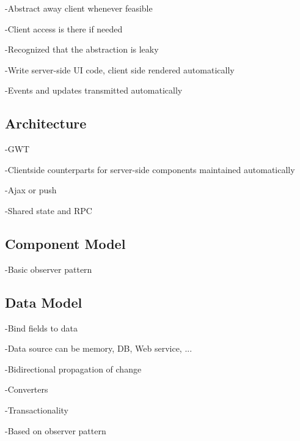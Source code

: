 -Abstract away client whenever feasible

-Client access is there if needed

-Recognized that the abstraction is leaky

-Write server-side UI code, client side rendered automatically

-Events and updates transmitted automatically

\subsection{Architecture}

-GWT

-Clientside counterparts for server-side components maintained automatically

-Ajax or push

-Shared state and RPC

\subsection{Component Model}

-Basic observer pattern

\subsection{Data Model}

-Bind fields to data

-Data source can be memory, DB, Web service, ...

-Bidirectional propagation of change

-Converters

-Transactionality

-Based on observer pattern

